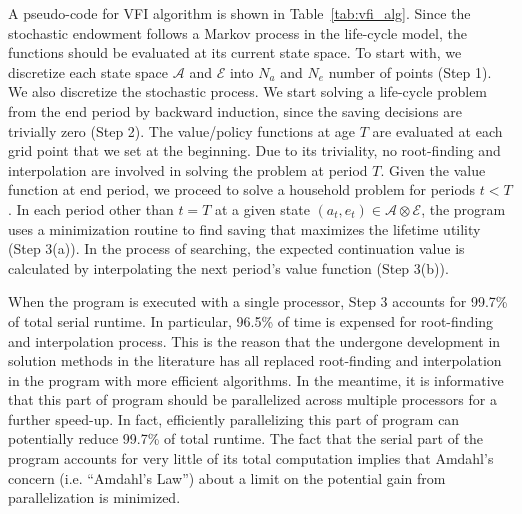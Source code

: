 \documentclass[12pt]{article}
\begin{document}
A pseudo-code for VFI algorithm is shown in Table~\ref{tab:vfi_alg}. Since the stochastic endowment follows a Markov process in the life-cycle model, the functions should be evaluated at its current state space. To start with, we discretize each state space $\mathcal{A}$ and $\mathcal{E}$ into $N_a$ and $N_e$ number of points (Step 1). We also discretize the stochastic process. We start solving a life-cycle problem from the end period by backward induction, since the saving decisions are trivially zero (Step 2). The value/policy functions at age $T$ are evaluated at each grid point that we set at the beginning. Due to its triviality, no root-finding and interpolation are involved in solving the problem at period $T$. Given the value function at end period, we proceed to solve a household problem for periods $t<T$. In each period other than $t=T$ at a given state $(a_t,e_t)\in\mathcal{A} \otimes \mathcal{E}$, the program uses a minimization routine to find saving that maximizes the lifetime utility (Step 3(a)). In the process of searching, the expected continuation value is calculated by interpolating the next period's value function (Step 3(b)). 

When the program is executed with a single processor, Step 3 accounts for 99.7\% of total serial runtime. In particular, 96.5\% of time is expensed for root-finding and interpolation process. 
This is the reason that the undergone development in solution methods in the literature has all replaced root-finding and interpolation in the program with more efficient algorithms. In the meantime, it is informative that this part of program should be parallelized across multiple processors for a further speed-up. In fact, efficiently parallelizing this part of program can potentially reduce 99.7\% of total runtime. The fact that the serial part of the program accounts for very little of its total computation implies that Amdahl's concern (i.e. ``Amdahl's Law'') about a limit on the potential gain from parallelization is minimized.
\end{document}
